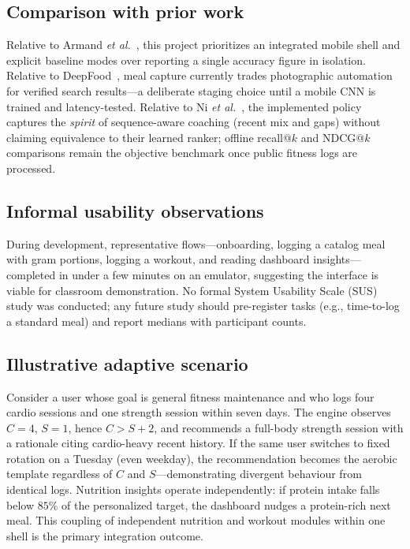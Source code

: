 \documentclass[conference]{IEEEtran}
\begin{document}
\subsection{Comparison with prior work}
Relative to Armand \emph{et al.}~\cite{armand2024systematic}, this project prioritizes an integrated mobile shell and explicit baseline modes over reporting a single accuracy figure in isolation. Relative to DeepFood~\cite{liu2016deepfood}, meal capture currently trades photographic automation for verified search results---a deliberate staging choice until a mobile CNN is trained and latency-tested. Relative to Ni \emph{et al.}~\cite{ni2019modeling}, the implemented policy captures the \emph{spirit} of sequence-aware coaching (recent mix and gaps) without claiming equivalence to their learned ranker; offline recall@$k$ and NDCG@$k$ comparisons remain the objective benchmark once public fitness logs are processed.

\subsection{Informal usability observations}
During development, representative flows---onboarding, logging a catalog meal with gram portions, logging a workout, and reading dashboard insights---completed in under a few minutes on an emulator, suggesting the interface is viable for classroom demonstration. No formal System Usability Scale (SUS) study was conducted; any future study should pre-register tasks (e.g., time-to-log a standard meal) and report medians with participant counts.

\subsection{Illustrative adaptive scenario}
Consider a user whose goal is general fitness maintenance and who logs four cardio sessions and one strength session within seven days. The engine observes $C{=}4$, $S{=}1$, hence $C > S + 2$, and recommends a full-body strength session with a rationale citing cardio-heavy recent history. If the same user switches to fixed rotation on a Tuesday (even weekday), the recommendation becomes the aerobic template regardless of $C$ and $S$---demonstrating divergent behaviour from identical logs. Nutrition insights operate independently: if protein intake falls below $85\%$ of the personalized target, the dashboard nudges a protein-rich next meal. This coupling of independent nutrition and workout modules within one shell is the primary integration outcome.
\end{document}
